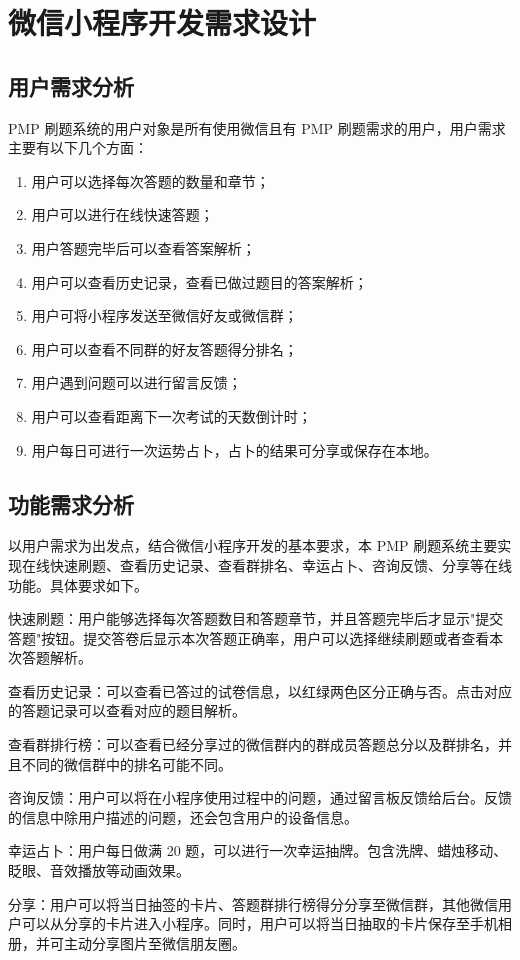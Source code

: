 \section{微信小程序开发需求设计}

\subsection{用户需求分析}

PMP 刷题系统的用户对象是所有使用微信且有 PMP 刷题需求的用户，用户需求主要有以下几个方面：

\begin{enumerate}
  \item 用户可以选择每次答题的数量和章节；
  \item 用户可以进行在线快速答题；
  \item 用户答题完毕后可以查看答案解析；
  \item 用户可以查看历史记录，查看已做过题目的答案解析；
  \item 用户可将小程序发送至微信好友或微信群；
  \item 用户可以查看不同群的好友答题得分排名；
  \item 用户遇到问题可以进行留言反馈；
  \item 用户可以查看距离下一次考试的天数倒计时；
  \item 用户每日可进行一次运势占卜，占卜的结果可分享或保存在本地。
\end{enumerate}

\subsection{功能需求分析}

以用户需求为出发点，结合微信小程序开发的基本要求，本 PMP 刷题系统主要实现在线快速刷题、查看历史记录、查看群排名、幸运占卜、咨询反馈、分享等在线功能。具体要求如下。

快速刷题：用户能够选择每次答题数目和答题章节，并且答题完毕后才显示"提交答题"按钮。提交答卷后显示本次答题正确率，用户可以选择继续刷题或者查看本次答题解析。

查看历史记录：可以查看已答过的试卷信息，以红绿两色区分正确与否。点击对应的答题记录可以查看对应的题目解析。

查看群排行榜：可以查看已经分享过的微信群内的群成员答题总分以及群排名，并且不同的微信群中的排名可能不同。

咨询反馈：用户可以将在小程序使用过程中的问题，通过留言板反馈给后台。反馈的信息中除用户描述的问题，还会包含用户的设备信息。

幸运占卜：用户每日做满 20 题，可以进行一次幸运抽牌。包含洗牌、蜡烛移动、眨眼、音效播放等动画效果。

分享：用户可以将当日抽签的卡片、答题群排行榜得分分享至微信群，其他微信用户可以从分享的卡片进入小程序。同时，用户可以将当日抽取的卡片保存至手机相册，并可主动分享图片至微信朋友圈。
